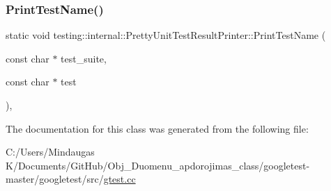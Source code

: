 \mbox{\label{classtesting_1_1internal_1_1_pretty_unit_test_result_printer_aba6463878ddb96303f620c62353bbdb5}} 
\subsubsection{\texorpdfstring{PrintTestName()}{PrintTestName()}\hspace{0.1cm}{\footnotesize\ttfamily [3/3]}}
{\footnotesize\ttfamily static void testing\+::internal\+::\+Pretty\+Unit\+Test\+Result\+Printer\+::\+Print\+Test\+Name (\begin{DoxyParamCaption}\item[{const char $\ast$}]{test\+\_\+suite,  }\item[{const char $\ast$}]{test }\end{DoxyParamCaption})\hspace{0.3cm}{\ttfamily [inline]}, {\ttfamily [static]}}



The documentation for this class was generated from the following file\+:\begin{DoxyCompactItemize}
\item 
C\+:/\+Users/\+Mindaugas K/\+Documents/\+Git\+Hub/\+Obj\+\_\+\+Duomenu\+\_\+apdorojimas\+\_\+class/googletest-\/master/googletest/src/\mbox{\hyperlink{googletest-master_2googletest_2src_2gtest_8cc}{gtest.\+cc}}\end{DoxyCompactItemize}
